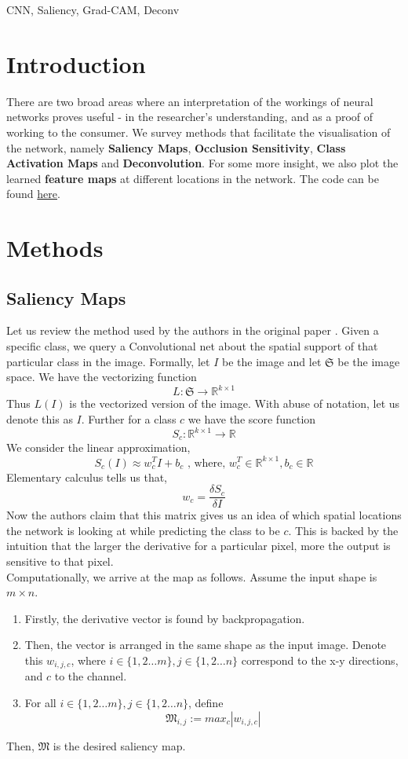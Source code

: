 \documentclass[conference]{IEEEtran}
\begin{document}
\begin{IEEEkeywords}
CNN, Saliency, Grad-CAM, Deconv 
\end{IEEEkeywords}

\section{Introduction}
There are two broad areas where an interpretation of the workings of neural networks proves useful - in the researcher's understanding, and as a proof of working to the consumer. We survey methods that facilitate the visualisation of the network, namely \textbf{Saliency Maps}, \textbf{Occlusion Sensitivity}, \textbf{Class Activation Maps} and \textbf{Deconvolution}. For some more insight, we also plot the learned \textbf{feature maps} at different locations in the network. The code can be found \href{https://github.com/prateekgargX/Visualizing-Neural-Networks}{here}.
\section{Methods}

\subsection{Saliency Maps}

Let us review the method used by the authors in the original paper \cite{saliency}. Given a specific class, we query a Convolutional net about the spatial support of that particular class in the image. Formally, let $I$ be the image and let $\mathfrak{S}$ be the image space. We have the vectorizing function
\[L: \mathfrak{S} \to \mathbb{R}^{k\times1}\]
Thus $L(I)$ is the vectorized version of the image. With abuse of notation, let us denote this as $I$. Further for a class $c$ we have the score function
\[S_c: \mathbb{R}^{k\times1} \to \mathbb{R}\]
We consider the linear approximation,
\[S_c(I) \approx w_c^TI + b_c \text{ , where, } w_c^T \in \mathbb{R}^{k\times1}, b_c \in \mathbb{R}\]
Elementary calculus tells us that,
\[w_c = \frac{\delta S_c}{\delta I}\]
Now the authors claim that this matrix gives us an idea of which spatial locations the network is looking at while predicting the class to be $c$. This is backed by the intuition that the larger the derivative for a particular pixel, more the output is sensitive to that pixel. \\ 
Computationally, we arrive at the map as follows. Assume the input shape is $m \times n$. \begin{enumerate}
\item Firstly, the derivative vector is found by backpropagation.
\item Then, the vector is arranged in the same shape as the input image. Denote this $w_{i,j,c}$, where $i \in \{1,2 \dots m\}, j \in \{1,2 \dots n\}$ correspond to the x-y directions, and $c$ to the channel.
\item For all $i \in \{1,2 \dots m\}, j \in \{1,2 \dots n\}$, define $$\mathfrak{M}_{i,j} := max_c|w_{i,j,c}|$$
\end{enumerate}
Then, $\mathfrak{M}$ is the desired saliency map. 
\end{document}
